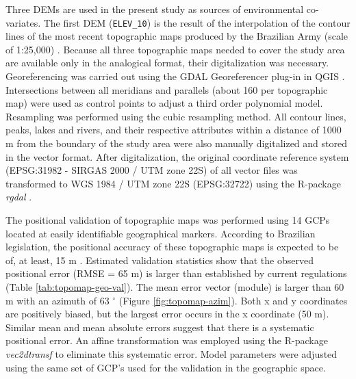 Three DEMs are used in the present study as sources of environmental co-variates. The first DEM (\texttt{ELEV\_10}) is the result of the interpolation of the contour lines of the most recent topographic maps produced by the Brazilian Army (scale of 1:25,000) \citep{DSG1980, DSG1992, DSG1992a}. Because all three topographic maps needed to cover the study area are available only in the analogical format, their digitalization was necessary. Georeferencing was carried out using the GDAL Georeferencer plug-in in QGIS \citep{GDAL2013, QGIS2013}. Intersections between all meridians and parallels (about 160 per topographic map) were used as control points to adjust a third order polynomial model. Resampling was performed using the cubic resampling method. All contour lines, peaks, lakes and rivers, and their respective attributes within a distance of 1000 m from the boundary of the study area were also manually digitalized and stored in the vector format. After digitalization, the original coordinate reference system (EPSG:31982 - SIRGAS 2000 / UTM zone 22S) of all vector files was transformed to WGS 1984 / UTM zone 22S (EPSG:32722) using the R-package \textit{rgdal} \citep{BivandEtAl2013a}.

The positional validation of topographic maps was performed using 14 GCPs located at easily identifiable geographical markers. According to Brazilian legislation, the positional accuracy of these topographic maps is expected to be of, at least, 15 m \citep{Brasil1984}. Estimated validation statistics show that the observed positional error (RMSE = 65 m) is larger than established by current regulations (Table \ref{tab:topomap-geo-val}). The mean error vector (module) is larger than 60 m with an azimuth of 63 $^{\circ}$ (Figure \ref{fig:topomap-azim}). Both x and y coordinates are positively biased, but the largest error occurs in the x coordinate (50 m). Similar mean and mean absolute errors suggest that there is a systematic positional error. An affine transformation was employed using the R-package \textit{vec2dtransf} \citep{Carrillo2012} to eliminate this systematic error. Model parameters were adjusted using the same set of GCP's used for the validation in the geographic space.

